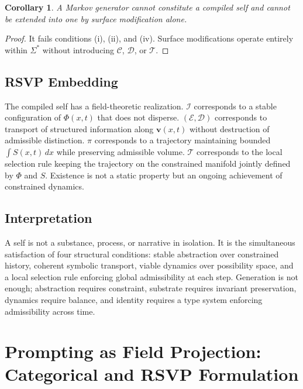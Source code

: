 \documentclass[12pt, a4paper]{article}
\theoremstyle{plain}
\newtheorem{corollary}[theorem]{Corollary}
\theoremstyle{definition}
\theoremstyle{remark}
\begin{document}
\begin{corollary}
A Markov generator cannot constitute a compiled self and cannot be extended into one by surface modification alone.
\end{corollary}

\begin{proof}
It fails conditions (i), (ii), and (iv). Surface modifications operate entirely within $\Sigma^*$ without introducing $\mathcal{C}$, $\mathcal{D}$, or $\mathcal{T}$.
\end{proof}

\subsection{RSVP Embedding}

The compiled self has a field-theoretic realization. $\mathcal{I}$ corresponds to a stable configuration of $\Phi(x,t)$ that does not disperse. $(\mathcal{E},\mathcal{D})$ corresponds to transport of structured information along $\mathbf{v}(x,t)$ without destruction of admissible distinction. $\pi$ corresponds to a trajectory maintaining bounded $\int S(x,t)\,dx$ while preserving admissible volume. $\mathcal{T}$ corresponds to the local selection rule keeping the trajectory on the constrained manifold jointly defined by $\Phi$ and $S$. Existence is not a static property but an ongoing achievement of constrained dynamics.

\subsection{Interpretation}

A self is not a substance, process, or narrative in isolation. It is the simultaneous satisfaction of four structural conditions: stable abstraction over constrained history, coherent symbolic transport, viable dynamics over possibility space, and a local selection rule enforcing global admissibility at each step. Generation is not enough; abstraction requires constraint, substrate requires invariant preservation, dynamics require balance, and identity requires a type system enforcing admissibility across time.

\section{Prompting as Field Projection: Categorical and RSVP Formulation}
\end{document}
